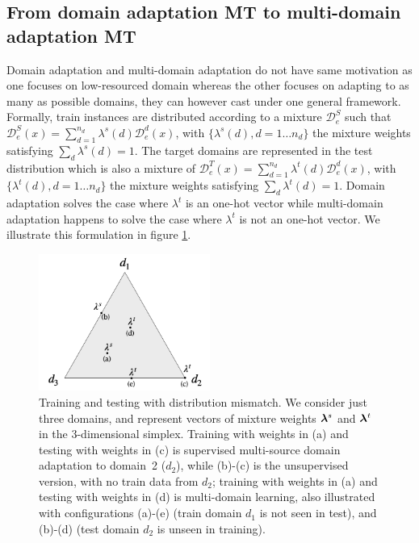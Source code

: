 \subsection{From domain adaptation MT to multi-domain adaptation MT}
\label{ssec:formulizaion}
Domain adaptation and multi-domain adaptation do not have same motivation as one focuses on low-resourced domain whereas the other focuses on adapting to as many as possible domains, they can however cast under one general framework. Formally, train instances are distributed according to a mixture $\mathcal{D}_e^S$ such that $\mathcal{D}_e^S(x) = \sum_{d=1}^{n_d} \lambda^{s}(d) \mathcal{D}_e^d(x)$, with $\{\lambda^{s}(d), d=1 \dots n_d\}$ the mixture weights satisfying $\sum_d \lambda^{s}(d)=1$. The target domains are represented in the test distribution which is also a mixture of $\mathcal{D}_e^T(x) = \sum_{d=1}^{n_d} \lambda^{t}(d) \mathcal{D}_e^d(x)$, with $\{\lambda^{t}(d), d=1 \dots n_d\}$ the mixture weights satisfying $\sum_d \lambda^{t}(d)=1$. Domain adaptation solves the case where $\lambda^t$ is an one-hot vector while multi-domain adaptation happens to solve the case where $\lambda^t$ is not an one-hot vector. We illustrate this formulation in figure \ref{fig:mdmt-lambdas}.
\begin{figure}[h]
  \centering
  \includegraphics[width=0.5\textwidth]{graphics/mdmt-lambdas}
  \caption[Training and testing with distribution mismatch]{Training and testing with distribution mismatch. We consider just three domains, and represent vectors of mixture weights $\bm{\lambda}^{s}$ and $\bm{\lambda}^{t}$ in the 3-dimensional simplex. Training with weights in (a) and testing with weights in (c) is supervised multi-source domain adaptation to domain~2 ($d_2$), while (b)-(c) is the unsupervised version, with no train data from $d_2$; training with weights in (a) and testing with weights in (d) is multi-domain learning, also illustrated with configurations (a)-(e) (train domain $d_1$ is not seen in test), and (b)-(d)  (test domain $d_2$ is unseen in training).}
  \label{fig:mdmt-lambdas}
\end{figure}

